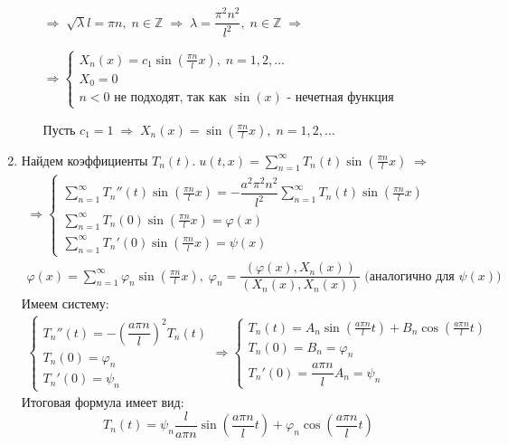 \begin{enumerate}
\begin{itemize}
				$\Rightarrow \; \sqrt{\lambda}l = \pi n, \; n \in \mathbb{Z} \; \Rightarrow \; \lambda = \dfrac{\pi^2n^2}{l^2}, \; n \in \mathbb{Z} \; \Rightarrow$

				$\Rightarrow \begin{cases}
					X_n(x) = c_1 \sin(\frac{\pi n}{l}x), \; n = 1, 2, \dots \\
					X_0 = 0 \\
					n < 0 \text{ не подходят, так как } \sin(x) \text{ - нечетная функция}
				\end{cases}$

				Пусть $ c_1 = 1 \; \Rightarrow \; X_n(x) = \sin(\frac{\pi n}{l}x), \; n = 1, 2, \dots$
		\end{itemize}

	\item 
		Найдем коэффициенты $ T_n(t). \; u(t, x) = \sum\limits_{n = 1}^\infty T_n(t)\sin(\frac{\pi n}{l}x) \; \Rightarrow$
		$$\begin{gathered}
			\Rightarrow \begin{cases}
				\sum\limits_{n = 1}^\infty T_n''(t)\sin(\frac{\pi n}{l}x) = 
				-\dfrac{a^2\pi^2n^2}{l^2}\sum\limits_{n = 1}^\infty T_n(t)\sin(\frac{\pi n}{l}x)\\
				\sum\limits_{n = 1}^\infty T_n(0)\sin(\frac{\pi n}{l}x) = \varphi(x) \\
				\sum\limits_{n = 1}^\infty T_n'(0)\sin(\frac{\pi n}{l}x) = \psi(x)
			\end{cases} \\
			\varphi(x) = \sum\limits_{n = 1}^\infty \varphi_n\sin(\frac{\pi n}{l}x), \; \varphi_n = \dfrac{(\varphi(x), X_n(x))}{(X_n(x), X_n(x))} \;\Big(\text{аналогично для } \psi(x) \Big)
		\end{gathered}$$
		Имеем систему:
		$$\begin{gathered}
			\begin{cases}
				T_n''(t) = -(\dfrac{a\pi n}{l})^2T_n(t) \\
				T_n(0) = \varphi_n \\
				T_n'(0) = \psi_n
			\end{cases} \Rightarrow 
			\begin{cases}
				T_n(t) = A_n \sin(\frac{a \pi n}{l}t) + B_n \cos(\frac{a \pi n}{l}t) \\
				T_n(0) = B_n = \varphi_n \\
				T_n'(0) = \dfrac{a \pi n}{l} A_n = \psi_n
			\end{cases}
		\end{gathered}$$
		Итоговая формула имеет вид:
		$$T_n(t) = \psi_n \dfrac{ l}{a \pi n} \sin(\frac{a \pi n}{l}t) + \varphi_n \cos(\frac{a \pi n}{l}t) $$
\end{enumerate}
	
